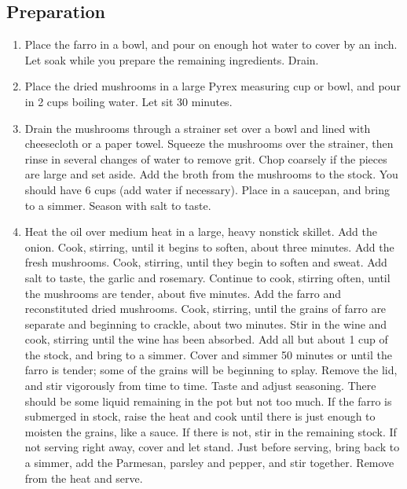 \subsection{Preparation}
\begin{enumerate}
    \item Place the farro in a bowl, and pour on enough hot water to cover by an inch. Let soak while you prepare the remaining ingredients. Drain.
    \item Place the dried mushrooms in a large Pyrex measuring cup or bowl, and pour in 2 cups boiling water. Let sit 30 minutes.
    \item Drain the mushrooms through a strainer set over a bowl and lined with cheesecloth or a paper towel. Squeeze the mushrooms over the strainer, then rinse in several changes of water to remove grit. Chop coarsely if the pieces are large and set aside. Add the broth from the mushrooms to the stock. You should have 6 cups (add water if necessary). Place in a saucepan, and bring to a simmer. Season with salt to taste.
    \item Heat the oil over medium heat in a large, heavy nonstick skillet. Add the onion. Cook, stirring, until it begins to soften, about three minutes. Add the fresh mushrooms. Cook, stirring, until they begin to soften and sweat. Add salt to taste, the garlic and rosemary. Continue to cook, stirring often, until the mushrooms are tender, about five minutes. Add the farro and reconstituted dried mushrooms. Cook, stirring, until the grains of farro are separate and beginning to crackle, about two minutes. Stir in the wine and cook, stirring until the wine has been absorbed. Add all but about 1 cup of the stock, and bring to a simmer. Cover and simmer 50 minutes or until the farro is tender; some of the grains will be beginning to splay. Remove the lid, and stir vigorously from time to time. Taste and adjust seasoning. There should be some liquid remaining in the pot but not too much. If the farro is submerged in stock, raise the heat and cook until there is just enough to moisten the grains, like a sauce. If there is not, stir in the remaining stock. If not serving right away, cover and let stand. Just before serving, bring back to a simmer, add the Parmesan, parsley and pepper, and stir together. Remove from the heat and serve.
\end{enumerate}



